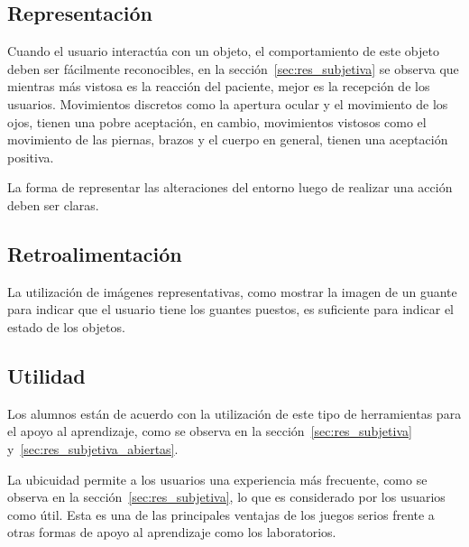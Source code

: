 \subsection{Representación}

Cuando el usuario interactúa con un objeto, el comportamiento de este objeto
deben ser fácilmente reconocibles, en la sección~\ref{sec:res_subjetiva} se
observa que mientras más vistosa es la reacción del paciente, mejor es la
recepción de los usuarios. Movimientos discretos como la apertura ocular y el
movimiento de los ojos, tienen una pobre aceptación, en cambio, movimientos
vistosos como el movimiento de las piernas, brazos y el cuerpo en general,
tienen una aceptación positiva.

La forma de representar las alteraciones del entorno luego de realizar una
acción deben ser claras.

\subsection{Retroalimentación}

La utilización de imágenes representativas, como mostrar la imagen de un guante
para indicar que el usuario tiene los guantes puestos, es suficiente para
indicar el estado de los objetos.

\subsection{Utilidad}

Los alumnos están de acuerdo con la utilización de este tipo de herramientas
para el apoyo al aprendizaje, como se observa en la
sección~\ref{sec:res_subjetiva} y~\ref{sec:res_subjetiva_abiertas}.

La ubicuidad permite a los usuarios una experiencia más frecuente, como se
observa en la sección~\ref{sec:res_subjetiva}, lo que es considerado por los
usuarios como útil. Esta es una de las principales ventajas de los juegos serios
frente a otras formas de apoyo al aprendizaje como los laboratorios.

